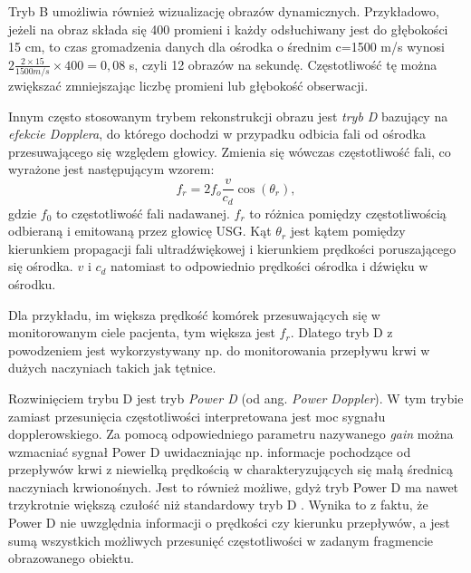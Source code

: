 Tryb B umożliwia również wizualizację obrazów dynamicznych. Przykładowo, jeżeli na obraz składa się 400 promieni i każdy odsłuchiwany jest do głębokości 15 cm, to czas gromadzenia danych dla ośrodka o średnim c=1500 m/s wynosi $2\frac{2\times15}{1500 m/s}\times400 = 0,08$ s, czyli 12 obrazów na sekundę. Częstotliwość tę można zwiększać zmniejszając liczbę promieni lub głębokość obserwacji.

Innym często stosowanym trybem rekonstrukcji obrazu jest \textit{tryb D} bazujący \linebreak na \textit{efekcie Dopplera}, do którego dochodzi w przypadku odbicia fali od ośrodka przesuwającego się względem głowicy. Zmienia się wówczas częstotliwość fali, co wyrażone jest następującym wzorem:
\begin{equation}
f_r = 2 f_o\frac{v}{c_d}\cos(\theta_r),
\end{equation} 
gdzie $f_0$ to częstotliwość fali nadawanej.  $f_r$ to różnica pomiędzy częstotliwością odbieraną i emitowaną przez głowicę USG. Kąt $\theta_r$ jest kątem pomiędzy kierunkiem propagacji fali ultradźwiękowej i kierunkiem prędkości poruszającego się ośrodka. \linebreak $v$ i $c_d$ natomiast to odpowiednio prędkości ośrodka i dźwięku w ośrodku.

Dla przykładu, im większa prędkość komórek przesuwających się w monitorowanym ciele pacjenta, tym większa jest $f_r$. Dlatego tryb D z powodzeniem jest wykorzystywany np. do monitorowania przepływu krwi w dużych naczyniach takich jak tętnice.

Rozwinięciem trybu D jest tryb \textit{Power D} (od ang. \textit{Power Doppler}). W tym trybie zamiast przesunięcia częstotliwości interpretowana jest moc sygnału dopplerowskiego. Za pomocą odpowiedniego parametru nazywanego \textit{gain} można wzmacniać sygnał Power D uwidaczniając np. informacje pochodzące od przepływów krwi z niewielką prędkością w charakteryzujących się małą średnicą naczyniach krwionośnych. Jest to również możliwe, gdyż tryb Power D ma nawet trzykrotnie większą czułość niż standardowy tryb D \cite{Babcock1996}. Wynika to z faktu, że Power D nie uwzględnia informacji o prędkości czy kierunku przepływów, a jest sumą wszystkich możliwych przesunięć częstotliwości w zadanym fragmencie obrazowanego obiektu.

